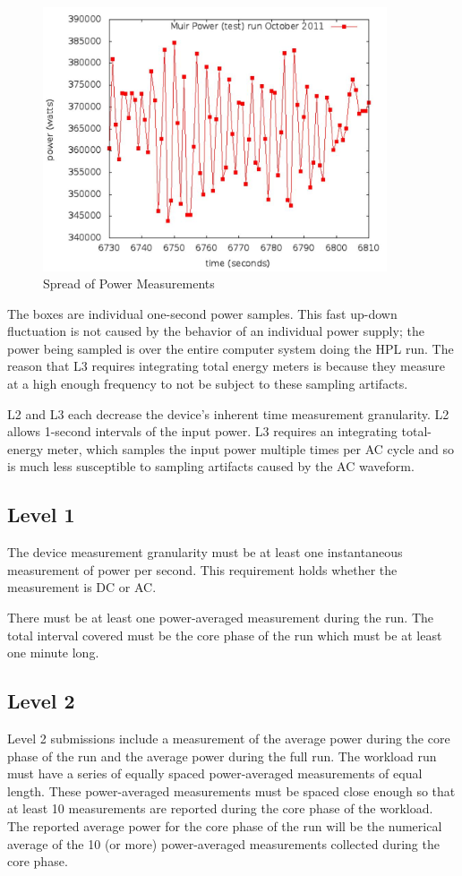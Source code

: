 \begin{figure}
\centering
\includegraphics[width=4in]{fig3-2}
\caption{Spread of Power Measurements}
\label{fig:sopm}
\end{figure}

\noindent
The boxes are individual one-second power samples.  This fast up-down fluctuation is not caused by the behavior of an individual power supply; the power being sampled is over the entire computer system doing the HPL run.  The reason that L3 requires integrating total energy meters is because they measure at a high enough frequency to not be subject to these sampling artifacts.
\wl

\noindent
L2 and L3 each decrease the device's inherent time measurement granularity.  L2 allows 1-second intervals of the input power.  L3 requires an integrating total-energy meter, which samples the input power multiple times per AC cycle and so is much less susceptible to sampling artifacts caused by the AC waveform.  

\subsection{Level 1}
\noindent
The device measurement granularity must be at least one instantaneous measurement of power per second. This requirement holds whether the measurement is DC or AC.
\wl

\noindent
There must be at least one power-averaged measurement during the run.
The total interval covered must be the core phase of the run which must be at
least one minute long.
\wl

\subsection{Level 2}
\noindent
Level 2 submissions include a measurement of the average power during the core phase of the run and the average power during the full run. The workload run must have a series of equally spaced power-averaged measurements of equal length. These power-averaged measurements must be spaced close enough so that at least 10 measurements are reported during the core phase of the workload. The reported average power for the core phase of the run will be the numerical average of the 10 (or more) power-averaged measurements collected during the core phase.  
\wl

